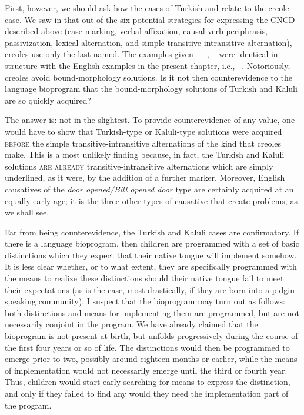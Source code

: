 First, however, we should ask how the cases of Turkish and  relate to the creole case. We saw in  that out of the six potential strategies for expressing the CNCD described above (case-marking, verbal affixation, causal-verb periphrasis, passivization, lexical
alternation, and simple transitive-intransitive alternation), creoles use only the last named. The examples given -- --,  -- were identical in structure with the English examples in the present chapter, i.e., --. Notoriously, creoles avoid bound-mor\-phol\-o\-gy solutions. Is it not then counterevidence to the language bioprogram that the bound-mor\-phol\-o\-gy solutions of Turkish and Kaluli are so quickly acquired?

The answer is: not in the slightest. To provide counterevidence of any value, one would have to show that Turkish-type or Kaluli-type solutions were acquired \textsc{before} the simple transitive-intransitive alternations of the kind that creoles make. This is a most unlikely finding because, in fact, the Turkish and Kaluli solutions \textsc{are already} transitive-intransitive alternations which are simply under\-lined, as it were, by the addition of a further marker. Moreover, English causatives of the \textit{door opened/Bill opened door} type are certainly acquired at an equally early age; it is the three other types of causative that create problems, as we shall see.

Far from being counterevidence, the Turkish and Kaluli cases are confirmatory. If there is a language bioprogram, then children are programmed with a set of basic distinctions which they expect that their native tongue will implement somehow. It is less clear whether, or to what extent, they are specifically programmed with the means to realize these distinctions should their native tongue fail to meet their expectations (as is the case, most drastically, if they are born into a pidgin-speaking community). I suspect that the bioprogram may turn out as follows: both distinctions and means for implementing them are programmed, but are not necessarily conjoint in the program. We have already claimed that the bioprogram is not present at birth, but unfolds progressively during the course of the first four years or so of life. The distinctions would then be programmed to emerge prior to two, possibly around eighteen months or earlier, while the means of implementation would not necessarily emerge until the third or fourth year. Thus, children would start early searching for means to express the distinction, and only if they failed to find any
would they need the implementation part of the program.

